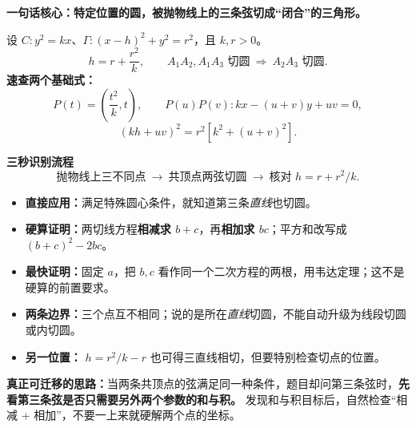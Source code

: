 \clearpage
\begin{summarybox}
\textbf{\textcolor{CSummary}{一句话核心：特定位置的圆，被抛物线上的三条弦切成“闭合”的三角形。}}

设 $C:y^2=kx$、$\Gamma:(x-h)^2+y^2=r^2$，且 $k,r>0$。
\[
\boxed{h=r+\frac{r^2}{k}},\qquad
\boxed{A_1A_2,A_1A_3\text{ 切圆}\ \Rightarrow\ A_2A_3\text{ 切圆}}.
\]
\textbf{速查两个基础式：}
\[
P(t)=\left(\frac{t^2}{k},t\right),\qquad
\boxed{P(u)P(v):kx-(u+v)y+uv=0},
\]
\[
\boxed{(kh+uv)^2=r^2[k^2+(u+v)^2]}.
\]

\medskip
\textbf{\textcolor{CSummary}{三秒识别流程}}
\[
\boxed{\text{抛物线上三不同点}}\ \longrightarrow\
\boxed{\text{共顶点两弦切圆}}\ \longrightarrow\
\boxed{\text{核对 }h=r+r^2/k}.
\]

\begin{itemize}[leftmargin=*,itemsep=0.42em]
 \item \textbf{直接应用：}满足特殊圆心条件，就知道第三条\emph{直线}也切圆。
 \item \textbf{硬算证明：}两切线方程\textbf{相减求 $b+c$}，再\textbf{相加求 $bc$}；平方和改写成 $(b+c)^2-2bc$。
 \item \textbf{最快证明：}固定 $a$，把 $b,c$ 看作同一个二次方程的两根，用韦达定理；这不是硬算的前置要求。
 \item \textbf{两条边界：}三个点互不相同；说的是所在\emph{直线}切圆，不能自动升级为线段切圆或内切圆。
 \item \textbf{另一位置：} $h=r^2/k-r$ 也可得三直线相切，但要特别检查切点的位置。
\end{itemize}

\medskip
\textbf{\textcolor{CSummary}{真正可迁移的思路：}}当两条共顶点的弦满足同一种条件，题目却问第三条弦时，\textbf{先看第三条弦是否只需要另外两个参数的和与积。} 发现和与积目标后，自然检查“相减 + 相加”，不要一上来就硬解两个点的坐标。
\end{summarybox}
